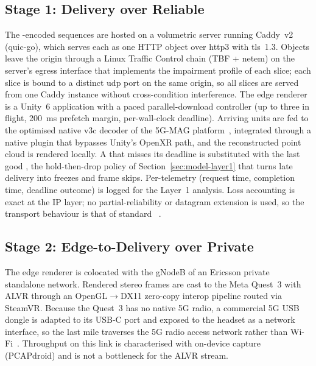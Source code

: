 \subsection{Stage 1: \vpcc Delivery over Reliable \quic}
\label{sec:sys-stage1}
The \vpcc-encoded sequences are hosted on a volumetric server running
Caddy~v2 (quic-go), which serves each \gof as one HTTP object over
\gls{http3} with \gls{tls}~1.3. Objects leave the origin through a Linux
Traffic Control chain (TBF + netem) on the server's egress interface
that implements the impairment profile of each slice; each slice is
bound to a distinct \gls{udp} port on the same origin, so all slices are
served from one Caddy instance without cross-condition interference.
The edge renderer is a Unity~6 application with a paced
parallel-download controller (up to three \gofs in flight,
\SI{200}{\milli\second} prefetch margin, per-\gof wall-clock
deadline). Arriving units are fed to the optimised native \gls{v3c} decoder
of the 5G-MAG platform~\cite{fivegmag}, integrated through a native
plugin that bypasses Unity's OpenXR path, and the reconstructed point
cloud is rendered locally. A \gof that misses its deadline is
substituted with the last good \gof, the hold-then-drop policy of
Section~\ref{sec:model-layer1} that turns late delivery into freezes
and frame skips. Per-\gof telemetry (request time,
completion time, deadline outcome) is logged for the Layer~1 analysis.
Loss accounting is exact at the IP layer; no partial-reliability or
datagram extension is used, so the transport behaviour is that of
standard \quic~\cite{rfc9000}.

\subsection{Stage 2: Edge-to-\hmd Delivery over Private \fiveg}
\label{sec:sys-stage2}
The edge renderer is colocated with the gNodeB of an Ericsson private
\fiveg standalone network. Rendered stereo frames are cast to the Meta
Quest~3 with ALVR through an OpenGL$\to$DX11 zero-copy interop pipeline
routed via SteamVR. Because the Quest~3 has no native 5G radio, a
commercial 5G USB dongle is adapted to its USB-C port and exposed to
the headset as a network interface, so the last mile traverses the 5G
radio access network rather than Wi-Fi~\cite{vquest2026}. Throughput
on this link is characterised with on-device capture (PCAPdroid) and
is not a bottleneck for the ALVR stream.

